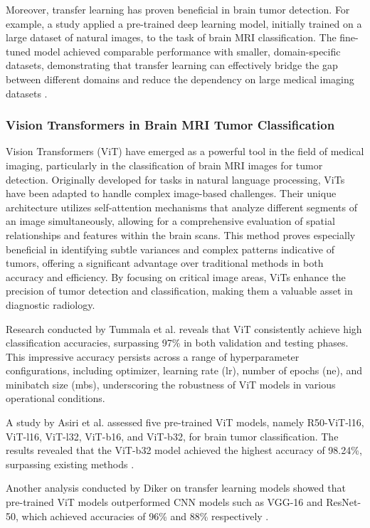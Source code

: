 Moreover, transfer learning has proven beneficial in brain tumor detection. For example, a study applied a pre-trained deep learning model, initially trained on a large dataset of natural images, to the task of brain MRI classification. The fine-tuned model achieved comparable performance with smaller, domain-specific datasets, demonstrating that transfer learning can effectively bridge the gap between different domains and reduce the dependency on large medical imaging datasets \cite{10125766}.

\subsubsection{Vision Transformers in Brain MRI Tumor Classification}

Vision Transformers (ViT) have emerged as a powerful tool in the field of medical imaging, particularly in the classification of brain MRI images for tumor detection. Originally developed for tasks in natural language processing, ViTs have been adapted to handle complex image-based challenges. Their unique architecture utilizes self-attention mechanisms that analyze different segments of an image simultaneously, allowing for a comprehensive evaluation of spatial relationships and features within the brain scans. This method proves especially beneficial in identifying subtle variances and complex patterns indicative of tumors, offering a significant advantage over traditional methods in both accuracy and efficiency. By focusing on critical image areas, ViTs enhance the precision of tumor detection and classification, making them a valuable asset in diagnostic radiology.

Research conducted by Tummala et al. \cite{Tummala2022} reveals that ViT consistently achieve high classification accuracies, surpassing 97\% in both validation and testing phases. This impressive accuracy persists across a range of hyperparameter configurations, including optimizer, learning rate (lr), number of epochs (ne), and minibatch size (mbs), underscoring the robustness of ViT models in various operational conditions.

A study by Asiri et al. assessed five pre-trained ViT models, namely R50-ViT-l16, ViT-l16, ViT-l32, ViT-b16, and ViT-b32, for brain tumor classification. The results revealed that the ViT-b32 model achieved the highest accuracy of 98.24\%, surpassing existing methods \cite{Asiri2023Advancing}. 

Another analysis conducted by Diker on transfer learning models showed that pre-trained ViT models outperformed CNN models such as VGG-16 and ResNet-50, which achieved accuracies of 96\% and 88\% respectively \cite{Diker2021A}.

